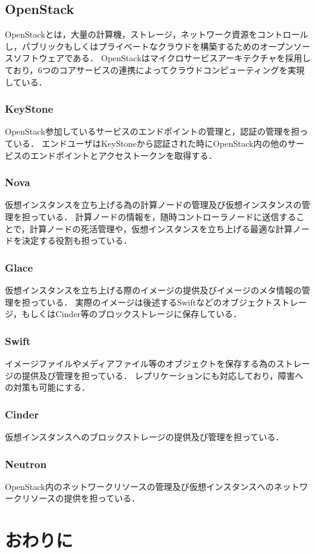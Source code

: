 \documentclass[11pt,a4paper]{jsarticle}
\begin{document}
\subsection{OpenStack}
OpenStackとは，大量の計算機，ストレージ，ネットワーク資源をコントロールし，パブリックもしくはプライベートなクラウドを構築するためのオープンソースソフトウェアである．
OpenStackはマイクロサービスアーキテクチャを採用しており，6つのコアサービスの連携によってクラウドコンピューティングを実現している．
\subsubsection{KeyStone}
OpenStack参加しているサービスのエンドポイントの管理と，認証の管理を担っている．
エンドユーザはKeyStoneから認証された時にOpenStack内の他のサービスのエンドポイントとアクセストークンを取得する．
\subsubsection{Nova}
仮想インスタンスを立ち上げる為の計算ノードの管理及び仮想インスタンスの管理を担っている．
計算ノードの情報を，随時コントローラノードに送信することで，計算ノードの死活管理や，仮想インスタンスを立ち上げる最適な計算ノードを決定する役割も担っている．
\subsubsection{Glace}
仮想インスタンスを立ち上げる際のイメージの提供及びイメージのメタ情報の管理を担っている．
実際のイメージは後述するSwiftなどのオブジェクトストレージ，もしくはCinder等のブロックストレージに保存している．
\subsubsection{Swift}
イメージファイルやメディアファイル等のオブジェクトを保存する為のストレージの提供及び管理を担っている．
レプリケーションにも対応しており，障害への対策も可能にする．
\subsubsection{Cinder}
仮想インスタンスへのブロックストレージの提供及び管理を担っている．
\subsubsection{Neutron}
OpenStack内のネットワークリソースの管理及び仮想インスタンスへのネットワークリソースの提供を担っている．

\section{おわりに}
\end{document}
